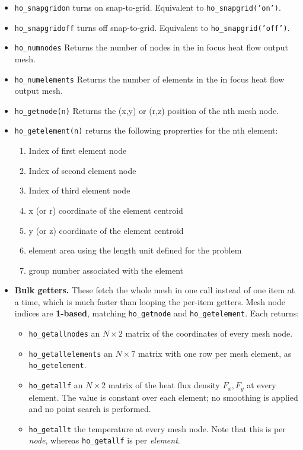 \begin{itemize}
\item{\tt ho\_snapgridon} turns on snap-to-grid. Equivalent to {\tt ho\_snapgrid('on')}.

\item{\tt ho\_snapgridoff} turns off snap-to-grid. Equivalent to {\tt ho\_snapgrid('off')}.

\item{\tt ho\_numnodes} Returns the number of nodes in the in focus heat flow output mesh.
\item{\tt ho\_numelements} Returns the number of elements in the in focus heat flow output mesh.
\item{\tt ho\_getnode(n)} Returns the (x,y) or (r,z) position of the nth mesh node.
\item{\tt ho\_getelement(n)} returns the following proprerties for the nth element:
    \begin{enumerate}
        \item Index of first element node
        \item Index of second element node
        \item Index of third element node
        \item x (or r) coordinate of the element centroid
        \item y (or z) coordinate of the element centroid
        \item element area using the length unit defined for the problem
        \item group number associated with the element
    \end{enumerate}


\item {\bf Bulk getters.}  These fetch the whole mesh in one call instead of one item at a time, which is much faster than looping the per-item getters.  Mesh node indices are {\bf 1-based}, matching {\tt ho\_getnode} and {\tt ho\_getelement}.  Each returns:

\begin{itemize}
\item{\tt ho\_getallnodes} an $N \times 2$ matrix of the coordinates of every mesh node.
\item{\tt ho\_getallelements} an $N \times 7$ matrix with one row per mesh element, as {\tt ho\_getelement}.
\item{\tt ho\_getallf} an $N \times 2$ matrix of the heat flux density $F_x, F_y$ at every element. The value is constant over each element; no smoothing is applied and no point search is performed.
\item{\tt ho\_getallt} the temperature at every mesh node. Note that this is per {\em node}, whereas {\tt ho\_getallf} is per {\em element}.
\end{itemize}

\end{itemize}
